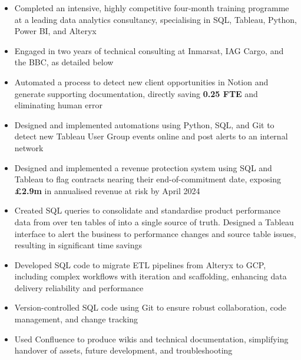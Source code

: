 \begin{paracol}{2}

\begin{itemize}
\item Completed an intensive, highly competitive four-month training programme at a leading data analytics consultancy, specialising in SQL, Tableau, Python, Power BI, and Alteryx
\item Engaged in two years of technical consulting at Inmarsat, IAG Cargo, and the BBC, as detailed below
\item Automated a process to detect new client opportunities in Notion and generate supporting documentation, directly saving \textbf{0.25 FTE} and eliminating human error
\item Designed and implemented automations using Python, SQL, and Git to detect new Tableau User Group events online and post alerts to an internal network

\medskip
{}

\end{itemize}

\divider


\begin{itemize}
\item Designed and implemented a revenue protection system using SQL and Tableau to flag contracts nearing their end-of-commitment date, exposing \textbf{£2.9m} in annualised revenue at risk by April 2024
\item Created SQL queries to consolidate and standardise product performance data from over ten tables of into a single source of truth. Designed a Tableau interface to alert the business to performance changes and source table issues, resulting in significant time savings
\item Developed SQL code to migrate ETL pipelines from Alteryx to GCP, including complex workflows with iteration and scaffolding, enhancing data delivery reliability and performance
\item Version-controlled SQL code using Git to ensure robust collaboration, code management, and change tracking
\item Used Confluence to produce wikis and technical documentation, simplifying handover of assets, future development, and troubleshooting


\end{itemize}
\end{paracol}
